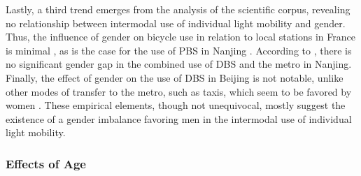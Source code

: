 \begin{refsegment}
Lastly, a third trend emerges from the analysis of the scientific corpus, revealing no relationship between intermodal use of individual light mobility and gender. Thus, the influence of gender on bicycle use in relation to local stations in France is minimal \textcolor{blue}{\autocite[25]{hasiak_access_2019}}, as is the case for the use of \acrshort{PBS} in Nanjing \textcolor{blue}{\autocite[128]{liu_understanding_2020}}. According to \textcolor{blue}{\textcite[12]{liu_use_2020}}, there is no significant gender gap in the combined use of \acrshort{DBS} and the metro in Nanjing. Finally, the effect of gender on the use of \acrshort{DBS} in Beijing is not notable, unlike other modes of transfer to the metro, such as taxis, which seem to be favored by women \textcolor{blue}{\autocite[14]{ni_exploring_2020}}. These empirical elements, though not unequivocal, mostly suggest the existence of a gender imbalance favoring men in the intermodal use of individual light mobility.%

\subsubsection*{Effects of Age
    \label{chap2:age}
    }


\end{refsegment}
